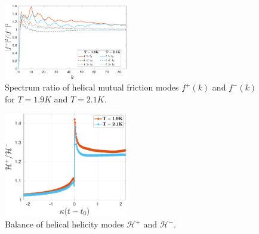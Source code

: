 \documentclass[%
 reprint,
 amsmath,amssymb,
 aps,
 prl,
]{revtex4-2}
\begin{document}
\begin{figure}
    \centering
    \includegraphics*[width=0.48\textwidth]{fmfDecompFig.pdf}
    \caption{Spectrum ratio of helical mutual friction modes $f^+(k)$ and $f^-(k)$ for $T=1.9K$ and $T=2.1K$.}
\end{figure}



\begin{figure}
    \centering
    \includegraphics*[width=0.48\textwidth]{hel-decomp.pdf}
    \caption{Balance of helical helicity modes $\mathcal{H}^+$ and $\mathcal{H}^-$. }
\end{figure}

\end{document}
